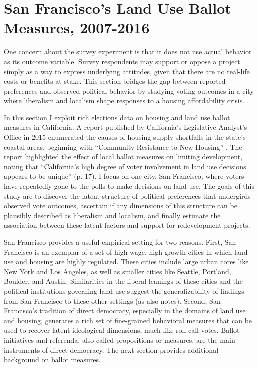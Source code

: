 \documentclass[article,12pt]{memoir}
\begin{document}
\section{San Francisco's Land Use Ballot Measures, 2007-2016}\label{sec:hg_sf}

One concern about the survey experiment is that it does not use actual behavior as its outcome variable.  Survey respondents may support or oppose a project simply as a way to express underlying attitudes, given that there are no real-life costs or benefits at stake.  This section bridges the gap between reported preferences and observed political behavior by studying voting outcomes in a city where liberalism and localism shape responses to a housing affordability crisis.

In this section I exploit rich elections data on housing and land use ballot measures in California.  A report published by California's Legislative Analyst's Office in 2015 enumerated the causes of housing supply shortfalls in the state's coastal areas, beginning with ``Community Resistance to New Housing'' \citep{alamo_californias_2015}.  The report highlighted the effect of local ballot measures on limiting development, noting that ``California's high degree of voter involvement in land use decisions appears to be unique'' (p. 17).  I focus on one city, San Francisco, where voters have repeatedly gone to the polls to make decisions on land use.  The goals of this study are to discover the latent structure of political preferences that undergirds observed vote outcomes, ascertain if any dimensions of this structure can be plausibly described as liberalism and localism, and finally estimate the association between these latent factors and support for redevelopment projects.

San Francisco provides a useful empirical setting for two reasons. First, San Francisco is an exemplar of a set of high-wage, high-growth cities in which land use and housing are highly regulated. These cities include large urban cores like New York and Los Angeles, as well as smaller cities like Seattle, Portland, Boulder, and Austin. Similarities in the liberal leanings of these cities and the political institutions governing land use suggest the generalizability of findings from San Francisco to these other settings (as \citealt{hankinson_when_2018} also notes). Second, San Francisco's tradition of direct democracy, especially in the domains of land use and housing, generates a rich set of fine-grained behavioral measures that can be used to recover latent ideological dimensions, much like roll-call votes.  Ballot initiatives and referenda, also called propositions or measures, are the main instruments of direct democracy.  The next section provides additional background on ballot measures.
\end{document}
